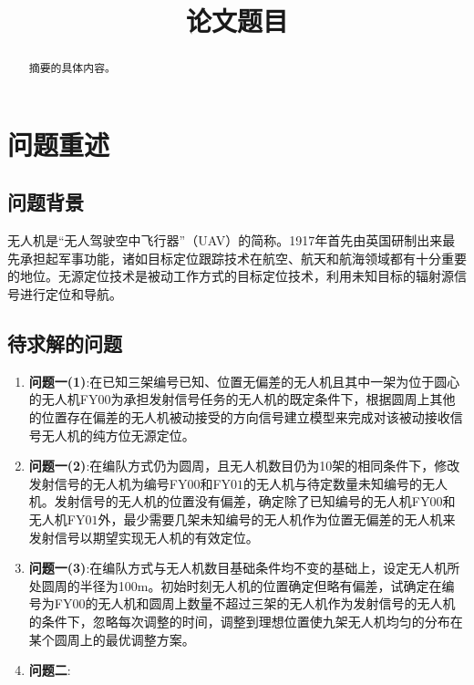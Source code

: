 \documentclass[withoutpreface,bwprint]{cumcmthesis} %
\title{论文题目}
\begin{document}
	\maketitle
	\begin{abstract}
		摘要的具体内容。
	\end{abstract}
	
	
		\section{问题重述}
		\subsection{问题背景}
		\par 无人机是“无人驾驶空中飞行器”（UAV）的简称。1917年首先由英国研制出来最先承担起军事功能，诸如目标定位跟踪技术在航空、航天和航海领域都有十分重要的地位。无源定位技术是被动工作方式的目标定位技术，利用未知目标的辐射源信号进行定位和导航。
		\subsection{待求解的问题}
		\par 
		\begin{enumerate}
			\item{\textbf{问题一(1)}:}在已知三架编号已知、位置无偏差的无人机且其中一架为位于圆心的无人机FY$ 00 $为承担发射信号任务的无人机的既定条件下，根据圆周上其他的位置存在偏差的无人机被动接受的方向信号建立模型来完成对该被动接收信号无人机的纯方位无源定位。
			\item{\textbf{问题一(2)}:}在编队方式仍为圆周，且无人机数目仍为10架的相同条件下，修改发射信号的无人机为编号FY$ 00 $和FY$ 01 $的无人机与待定数量未知编号的无人机。发射信号的无人机的位置没有偏差，确定除了已知编号的无人机FY$ 00 $和无人机FY$ 01 $外，最少需要几架未知编号的无人机作为位置无偏差的无人机来发射信号以期望实现无人机的有效定位。
			\item{\textbf{问题一(3)}:}在编队方式与无人机数目基础条件均不变的基础上，设定无人机所处圆周的半径为100m。初始时刻无人机的位置确定但略有偏差，试确定在编号为FY$ 00 $的无人机和圆周上数量不超过三架的无人机作为发射信号的无人机的条件下，忽略每次调整的时间，调整到理想位置使九架无人机均匀的分布在某个圆周上的最优调整方案。
			\item{\textbf{问题二}:}
		\end{enumerate}
\end{document}
